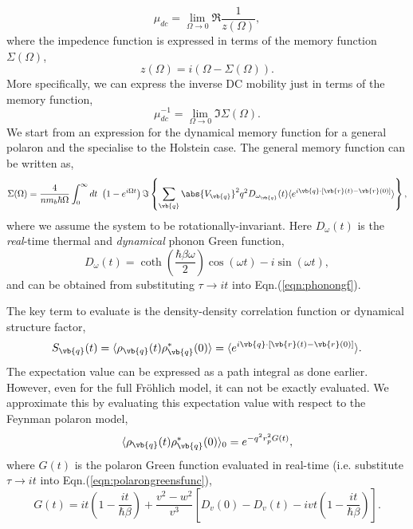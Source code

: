 \begin{equation}\label{eqn:mobility}
    \mu_{dc} = \lim_{\Omega \to 0} \Re{\frac{1}{z(\Omega)}},
\end{equation}
where the impedence function is expressed in terms of the memory function $\Sigma(\Omega)$,
\begin{equation}
    z(\Omega) = i \left( \Omega - \Sigma(\Omega) \right).
\end{equation}
More specifically, we can express the inverse DC mobility just in terms of the memory function,
\begin{equation}
    \mu_{dc}^{-1} = \lim_{\Omega \to 0} \Im{\Sigma(\Omega)}.
\end{equation}
We start from an expression for the dynamical memory function for a general polaron and the specialise to the Holstein case. The general memory function can be written as,
\begin{equation}
    \Sigma(\Omega) = \frac{4}{n m_b \hbar\Omega} \int_0^{\infty} dt\ \left(1 - e^{i \Omega t}\right) \Im \left\{ \sum_{\vb{q}} \abs{V_{\vb{q}}}^2 q^2 D_{\omega_{\vb{q}}}(t) \langle e^{i \vb{q} \cdot \left[ \vb{r}(t) - \vb{r}(0) \right]} \rangle \right\},
\end{equation}
where we assume the system to be rotationally-invariant. Here $D_{\omega}(t)$ is the \emph{real}-time thermal and \emph{dynamical} phonon Green function,
\begin{equation}
    D_\omega(t) = \coth(\frac{\hbar \beta \omega}{2}) \cos(\omega t) - i \sin(\omega t),
\end{equation}
and can be obtained from substituting $\tau \to i t$ into Eqn.(\ref{eqn:phonongf}).
\newline

The key term to evaluate is the density-density correlation function or dynamical structure factor,
\begin{equation}
    S_{\vb{q}}(t) = \langle \rho_{\vb{q}}(t) \rho^*_{\vb{q}}(0) \rangle = \langle e^{i \vb{q} \cdot \left[ \vb{r}(t) - \vb{r}(0) \right]} \rangle.
\end{equation}
The expectation value can be expressed as a path integral as done earlier. However, even for the full Fr\"ohlich model, it can not be exactly evaluated. We approximate this by evaluating this expectation value with respect to the Feynman polaron model,
\begin{equation}
    \langle \rho_{\vb{q}}(t) \rho^*_{\vb{q}}(0) \rangle_0 = e^{-q^2 r_p^2 G(t)},
\end{equation}
where $G(t)$ is the polaron Green function evaluated in real-time (i.e. substitute $\tau \to it$ into Eqn.(\ref{eqn:polarongreensfunc}),
\begin{equation}
    G(t) = i t \left(1 - \frac{i t}{\hbar \beta} \right) + \frac{v^2 - w^2}{v^3} \left[ D_v(0) - D_v(t)  - i v t \left(1 - \frac{i t}{\hbar \beta} \right) \right].
\end{equation}

